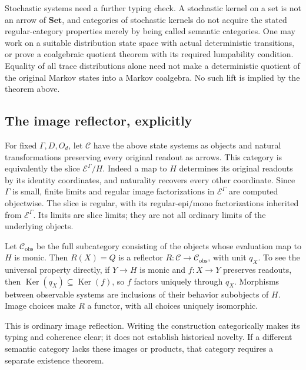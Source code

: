 \documentclass[11pt]{article}
\theoremstyle{definition}
\theoremstyle{remark}\newtheorem{remark}[theorem]{Remark}
\newcommand{\E}{\mathcal E}
\newcommand{\C}{\mathcal C}
\newcommand{\Ker}{\operatorname{Ker}}
\begin{document}
Stochastic systems need a further typing check. A stochastic kernel on a
set is not an arrow of $\mathbf{Set}$, and categories of stochastic
kernels do not acquire the stated regular-category properties merely by
being called semantic categories. One may work on a suitable distribution
state space with actual deterministic transitions, or prove a coalgebraic
quotient theorem with its required lumpability condition. Equality of all
trace distributions alone need not make a deterministic quotient of the
original Markov states into a Markov coalgebra. No such lift is implied
by the theorem above.

\subsection{The image reflector, explicitly}
For fixed $\Gamma,D,O_d$, let $\C$ have the above state systems as objects
and natural transformations preserving every original readout as arrows.
This category is equivalently the slice $\E^\Gamma/H$. Indeed a map to
$H$ determines its original readouts by its identity coordinates, and
naturality recovers every other coordinate. Since $\Gamma$ is small,
finite limits and regular image factorizations in $\E^\Gamma$ are
computed objectwise. The slice is regular, with its regular-epi/mono
factorizations inherited from $\E^\Gamma$. Its limits are slice limits;
they are not all ordinary limits of the underlying objects.

Let $\C_{\mathrm{obs}}$ be the full subcategory consisting of the objects
whose evaluation map to $H$ is monic. Then $R(X)=Q$ is a reflector
$R:\C\to\C_{\mathrm{obs}}$, with unit $q_X$. To see the universal
property directly, if $Y\to H$ is monic and $f:X\to Y$ preserves
readouts, then $\Ker(q_X)\subseteq\Ker(f)$, so $f$ factors uniquely
through $q_X$. Morphisms between observable systems are inclusions of their
behavior subobjects of $H$. Image choices make $R$ a functor, with all
choices uniquely isomorphic.

This is ordinary image reflection. Writing the construction categorically
makes its typing and coherence clear; it does not establish historical
novelty. If a different semantic category lacks these images or products,
that category requires a separate existence theorem.
\end{document}
